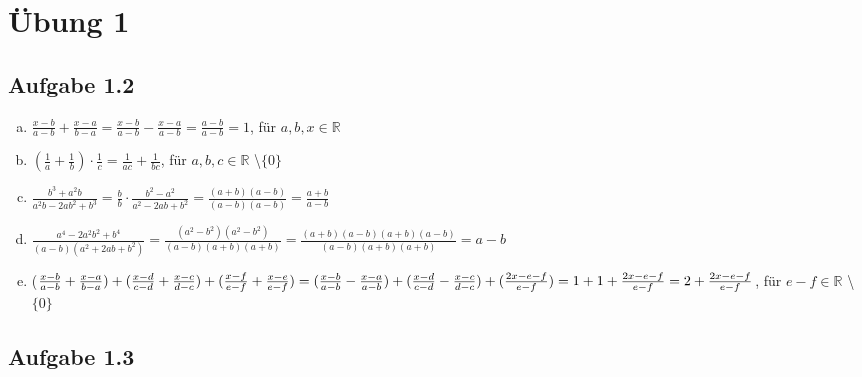 \documentclass{standalone}
\begin{document}
\section{Übung 1}

\subsection{Aufgabe 1.2}

\begin{enumerate}[a)]
    \item $\frac{x-b}{a-b} + \frac{x-a}{b-a} 
    = \frac{x-b}{a-b} - \frac{x-a}{a-b}
    = \frac{a-b}{a-b}
    = 1
    $, für $a, b, x \in \mathbb{R}$

    \item $(\frac{1}{a} + \frac{1}{b}) \cdot \frac{1}{c} =
    \frac{1}{ac} + \frac{1}{bc}
    $, für $a, b, c \in \mathbb{R}$ \textbackslash $\{0\}$
    
    \item $\frac{b^3+a^2b}{a^2b-2ab^2+b^3} = 
    \frac{b}{b} \cdot \frac{b^2-a^2}{a^2-2ab+b^2} = 
    \frac{(a+b)(a-b)}{(a-b)(a-b)} = 
    \frac{a+b}{a-b}
    $

    \item $\frac{a^4-2a^2b^2+b^4}{(a-b)(a^2+2ab+b^2)} =
    \frac{(a^2-b^2)(a^2-b^2)}{(a-b)(a+b)(a+b)} = 
    \frac{(a+b)(a-b)(a+b)(a-b)}{(a-b)(a+b)(a+b)} = 
    a-b
    $

    \item ($\frac{x-b}{a-b} + \frac{x-a}{b-a}) + (\frac{x-d}{c-d} + \frac{x-c}{d-c}) + (\frac{x-f}{e-f} + \frac{x-e}{e-f}) = \\
    (\frac{x-b}{a-b} - \frac{x-a}{a-b}) + (\frac{x-d}{c-d} - \frac{x-c}{d-c}) + (\frac{2x-e-f}{e-f}) = \\
    1 + 1 + \frac{2x-e-f}{e-f} = 2 + \frac{2x-e-f}{e-f}
    $, für $e-f \in \mathbb{R}$ \textbackslash $\{0\}$
\end{enumerate}

\subsection{Aufgabe 1.3}
\end{document}
